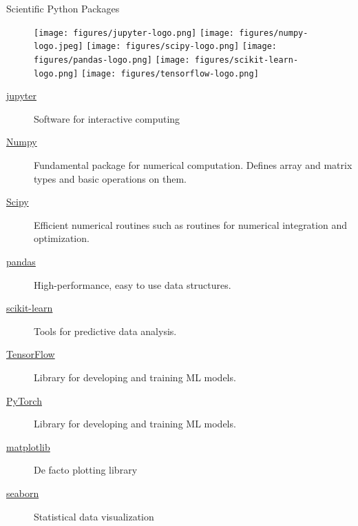 \documentclass[aspectratio=169]{beamer}
\begin{document}
    \begin{frame}{Scientific Python Packages}
        \begin{figure}
            \centering
            \texttt{[image: figures/jupyter-logo.png]}
            \texttt{[image: figures/numpy-logo.jpeg]}
            \texttt{[image: figures/scipy-logo.png]}
            \texttt{[image: figures/pandas-logo.png]}
            \texttt{[image: figures/scikit-learn-logo.png]}
            \texttt{[image: figures/tensorflow-logo.png]}
        \end{figure}
        \begin{description}
            \item[\href{http://jupyter.org/}{jupyter}] Software for interactive computing
            \item[\href{http://www.scipy.org/}{Numpy}] Fundamental package for numerical computation. Defines array and matrix types and basic operations on them.
            \item[\href{http://www.scipy.org/}{Scipy}] Efficient numerical routines such as routines for numerical integration and optimization.
            \item[\href{http://pandas.pydata.org/}{pandas}] High-performance, easy to use data structures.
            \item[\href{http://scikit-learn.org/}{scikit-learn}] Tools for predictive data analysis.
            \item[\href{http://www.tensorflow.org/}{TensorFlow}] Library for developing and training ML models.
            \item[\href{http://pytorch.org/}{PyTorch}] Library for developing and training ML models.
            \item[\href{http://matplotlib.org/}{matplotlib}] De facto plotting library
            \item[\href{http://seaborn.pydata.org/}{seaborn}] Statistical data visualization
        \end{description}
    \end{frame}
\end{document}
